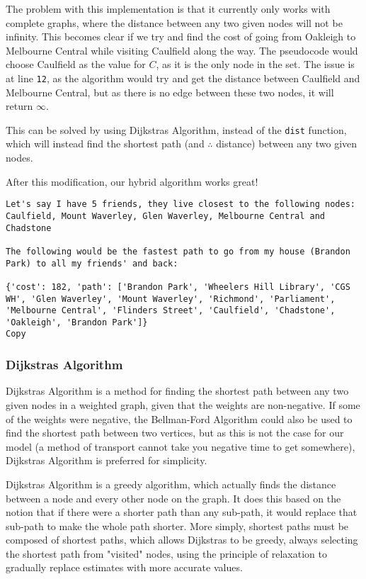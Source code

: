 \documentclass[
]{article}
\begin{document}
The problem with this implementation is that it currently only works
with complete graphs, where the distance between any two given nodes
will not be infinity. This becomes clear if we try and find the cost of
going from Oakleigh to Melbourne Central while visiting Caulfield along
the way. The pseudocode would choose Caulfield as the value for {\(C\)},
as it is the only node in the set. The issue is at line \texttt{12}, as
the algorithm would try and get the distance between Caulfield and
Melbourne Central, but as there is no edge between these two nodes, it
will return {\(\infty\)}.

This can be solved by using Dijkstra\textquotesingle s Algorithm,
instead of the \texttt{dist} function, which will instead find the
shortest path (and {\(\therefore\)} distance) between any two given
nodes.

After this modification, our hybrid algorithm works great!

\begin{verbatim}
Let's say I have 5 friends, they live closest to the following nodes: Caulfield, Mount Waverley, Glen Waverley, Melbourne Central and Chadstone

The following would be the fastest path to go from my house (Brandon Park) to all my friends' and back:

{'cost': 182, 'path': ['Brandon Park', 'Wheelers Hill Library', 'CGS WH', 'Glen Waverley', 'Mount Waverley', 'Richmond', 'Parliament', 'Melbourne Central', 'Flinders Street', 'Caulfield', 'Chadstone', 'Oakleigh', 'Brandon Park']}
Copy
\end{verbatim}

\hypertarget{dijkstras-algorithm}{%
\subsubsection{Dijkstra\textquotesingle s
Algorithm}\label{dijkstras-algorithm}}

Dijkstra\textquotesingle s Algorithm is a method for finding the
shortest path between any two given nodes in a weighted graph, given
that the weights are non-negative. If some of the weights were negative,
the Bellman-Ford Algorithm could also be used to find the shortest path
between two vertices, but as this is not the case for our model (a
method of transport cannot take you negative time to get somewhere),
Dijkstra\textquotesingle s Algorithm is preferred for simplicity.

Dijkstra\textquotesingle s Algorithm is a greedy algorithm, which
actually finds the distance between a node and every other node on the
graph. It does this based on the notion that if there were a shorter
path than any sub-path, it would replace that sub-path to make the whole
path shorter. More simply, shortest paths must be composed of shortest
paths, which allows Dijkstra\textquotesingle s to be greedy, always
selecting the shortest path from "visited" nodes, using the principle of
relaxation to gradually replace estimates with more accurate values.
\end{document}
